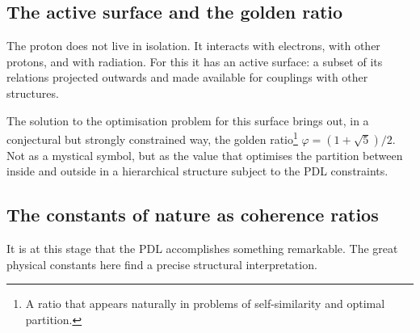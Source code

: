 \documentclass[12pt, a4paper, openright]{book}
\begin{document}
\subsection*{The active surface and the golden ratio}

The proton does not live in isolation. It interacts with electrons, with other protons, and with radiation. For this it has an active surface: a subset of its relations projected outwards and made available for couplings with other structures.

\medskip

The solution to the optimisation problem for this surface brings out, in a conjectural but strongly constrained way, the golden ratio\footnote{A ratio that appears naturally in problems of self-similarity and optimal partition.} $\varphi = (1+\sqrt{5})/2$. Not as a mystical symbol, but as the value that optimises the partition between inside and outside in a hierarchical structure subject to the PDL constraints.

\subsection*{The constants of nature as coherence ratios}

It is at this stage that the PDL accomplishes something remarkable. The great physical constants here find a precise structural interpretation.

\medskip
\end{document}
